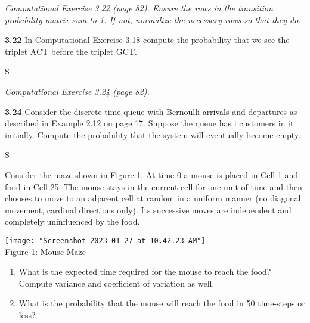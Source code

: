 \documentclass[answers]{exam}
\begin{document}
\begin{questions}
\question 
\textit{Computational Exercise 3.22 (page 82). 
	Ensure the rows in the transition probability matrix sum to 1. 
	If not, normalize the necessary rows so that they do.}

\textbf{3.22} In Computational Exercise 3.18 compute the probability 
that we see the triplet ACT before the triplet GCT.

\begin{solution}
	S
\end{solution}

\question 
\textit{Computational Exercise 3.24 (page 82).}

\textbf{3.24} Consider the discrete time queue with 
Bernoulli arrivals and departures as described in Example 2.12 on page 17. 
Suppose the queue has i customers in it initially. 
Compute the probability that the system will eventually become empty.

\begin{solution}
	S
\end{solution}

\question 
	Consider the maze shown in Figure {\color{red} 1}. 
	At time 0 a mouse is placed in Cell 1 and food in Cell 25. 
	The mouse stays in the current cell for one unit of time and 
	then chooses to move to an adjacent cell at random in a uniform manner 
	(no diagonal movement, cardinal directions only). 
	Its successive moves are independent and completely uninfluenced by the food.
	
	\begin{center}
		\texttt{[image: "Screenshot 2023-01-27 at 10.42.23 AM"]}
		\\ Figure 1: Mouse Maze
	\end{center}
	
	
	\begin{enumerate}[label=(\alph*)]
		\item What is the expected time required for the mouse to reach the food? 
		Compute variance and coefficient of variation as well.
		
		\item What is the probability that the mouse will reach the food in 50 time-steps or less?
		

\end{enumerate}
\end{questions}
\end{document}
